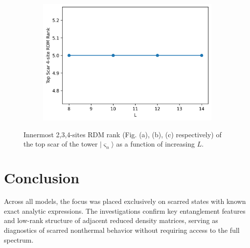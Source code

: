 \documentclass[11pt]{article}
\begin{document}
\begin{itemize}
\begin{itemize}
\begin{figure}[H]
\begin{subfigure}{0.45\textwidth}
        \includegraphics[width=\linewidth]{hb_scar_4.png}
        \caption{}
        \label{fig:image3hb}
    \end{subfigure}

    \caption{Innermost 2,3,4-sites RDM  rank (Fig. (a), (b), (c) respectively) of the top scar of the tower $|\varsigma_n\rangle$ as a function of increasing $L$.}
    \label{fig:hb_scars_tower}
\end{figure}

    \end{itemize}
\end{itemize}


\vspace{0.5cm}
\pagebreak
\section*{Conclusion}

Across all models, the focus was placed exclusively on scarred states with known exact analytic expressions. The investigations confirm key entanglement features and low-rank structure of adjacent reduced density matrices, serving as diagnostics of scarred nonthermal behavior without requiring access to the full spectrum.
\end{document}
